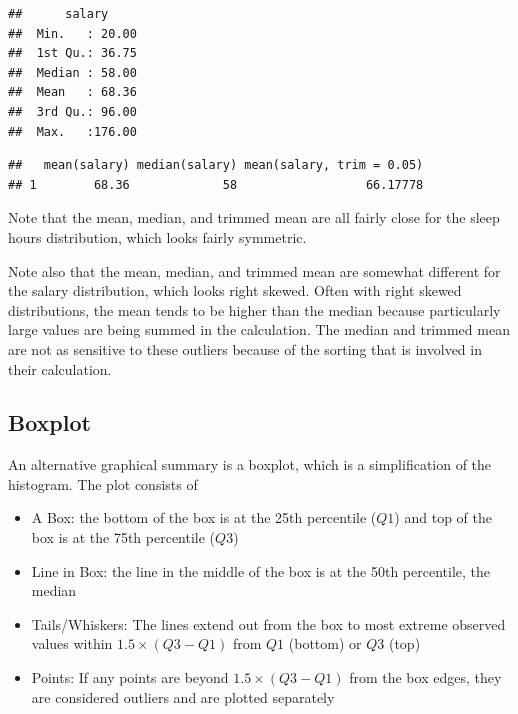 \documentclass[]{book}
\newenvironment{Shaded}{\begin{snugshade}}{\end{snugshade}}
\newcommand{\DataTypeTok}[1]{\textcolor[rgb]{0.13,0.29,0.53}{#1}}
\newcommand{\FloatTok}[1]{\textcolor[rgb]{0.00,0.00,0.81}{#1}}
\newcommand{\KeywordTok}[1]{\textcolor[rgb]{0.13,0.29,0.53}{\textbf{#1}}}
\newcommand{\NormalTok}[1]{#1}
\newcommand{\OperatorTok}[1]{\textcolor[rgb]{0.81,0.36,0.00}{\textbf{#1}}}
\newcommand{\StringTok}[1]{\textcolor[rgb]{0.31,0.60,0.02}{#1}}
\providecommand{\tightlist}{%
  \setlength{\itemsep}{0pt}\setlength{\parskip}{0pt}}
\begin{document}
\begin{verbatim}
##      salary      
##  Min.   : 20.00  
##  1st Qu.: 36.75  
##  Median : 58.00  
##  Mean   : 68.36  
##  3rd Qu.: 96.00  
##  Max.   :176.00
\end{verbatim}

\begin{Shaded}
\end{Shaded}

\begin{verbatim}
##   mean(salary) median(salary) mean(salary, trim = 0.05)
## 1        68.36             58                  66.17778
\end{verbatim}

Note that the mean, median, and trimmed mean are all fairly close for the sleep hours distribution, which looks fairly symmetric.

Note also that the mean, median, and trimmed mean are somewhat different for the salary distribution, which looks right skewed. Often with right skewed distributions, the mean tends to be higher than the median because particularly large values are being summed in the calculation. The median and trimmed mean are not as sensitive to these outliers because of the sorting that is involved in their calculation.

\hypertarget{boxplot}{%
\subsection{Boxplot}\label{boxplot}}

An alternative graphical summary is a boxplot, which is a simplification of the histogram. The plot consists of

\begin{itemize}
\tightlist
\item
  A Box: the bottom of the box is at the 25th percentile (\(Q1\)) and top of the box is at the 75th percentile (\(Q3\))
\item
  Line in Box: the line in the middle of the box is at the 50th percentile, the median
\item
  Tails/Whiskers: The lines extend out from the box to most extreme observed values within \(1.5 \times (Q3-Q1)\) from \(Q1\) (bottom) or \(Q3\) (top)
\item
  Points: If any points are beyond \(1.5 \times (Q3-Q1)\) from the box edges, they are considered outliers and are plotted separately
\end{itemize}
\end{document}
